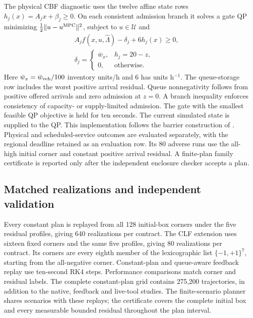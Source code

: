 \documentclass[journal,10pt]{IEEEtran}
\begin{document}
The physical CBF diagnostic uses the twelve affine state rows
$h_j(x)=A_jx+\beta_j\ge0$. On each consistent admission branch it solves a
gate QP minimizing $\frac12\|u-u^{\rm MPC}\|^2$, subject to
$u\in\mathcal U$ and
\begin{equation}
\begin{gathered}
A_jf(x,u,\widehat\Lambda)-\delta_j+6h_j(x)\ge0,\\
\delta_j=\begin{cases}\bar w_x,&h_j=20-z,\\0,&\text{otherwise}.
\end{cases}
\end{gathered}
\label{eq:benchmark-cbf}
\end{equation}
Here $\bar w_x=\bar w_{\rm veh}/100$ inventory units/h and $6$ has units
h$^{-1}$. The queue-storage row includes the worst positive arrival
residual. Queue nonnegativity follows from positive offered arrivals and
zero admission at $z=0$. A branch inequality enforces consistency of
capacity- or supply-limited admission. The gate with the smallest feasible
QP objective is held for ten seconds. The current simulated state is
supplied to the QP. This implementation follows the barrier construction
of \cite{ames2017}. Physical and scheduled-service outcomes are evaluated
separately, with the regional deadline retained as an evaluation row.
Its 80 adverse runs use the all-high initial corner and constant positive
arrival residual. A finite-plan family certificate is reported only after
the independent enclosure checker accepts a plan.

\subsection{Matched realizations and independent validation}
Every constant plan is replayed from all 128 initial-box corners under the
five residual profiles, giving 640 realizations per contract. The CLF
extension uses sixteen fixed corners and the same five profiles, giving
80 realizations per contract. Its corners are every eighth member of the
lexicographic list $\{-1,+1\}^7$, starting from the all-negative corner.
Constant-plan and queue-aware feedback replay use ten-second RK4 steps.
Performance comparisons match corner and residual labels. The complete
constant-plan grid contains 275,200 trajectories, in addition to the
native, feedback and live-tool studies. The finite-scenario planner shares
scenarios with these replays; the certificate covers the complete initial
box and every measurable bounded residual throughout the plan interval.
\end{document}
